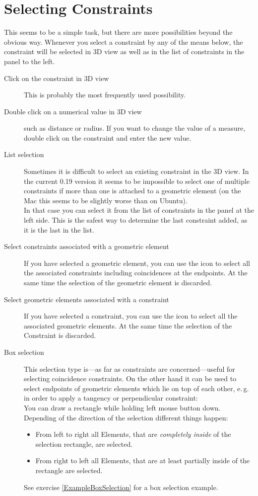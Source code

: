 \documentclass[12pt,titlepage]{article}
\newcommand{\icon}[1]{\raisebox{-1em}{\rule{0pt}{27pt}\texttt{[image: images/\#1]}}}
\begin{document}
\section{Selecting Constraints} This seems to be a simple task, but there are more possibilities beyond the obvious way. Whenever you select a constraint by any of the means below, the constraint will be selected in 3D view as well as in the list of constraints in the panel to the left. \begin{description} \item [Click on the constraint in 3D view] This is probably the most frequently used possibility. \item [Double click on a numerical value in 3D view] such as distance or radius. If you want to change the value of a measure, double click on the constraint and enter the new value. \item [List selection] Sometimes it is difficult to select an existing constraint in the 3D view. In the current 0.19 version it seems to be impossible to select one of multiple constraints if more than one is attached to a geometric element (on the Mac this seems to be slightly worse than on Ubuntu).\\ In that case you can select it from the list of constraints in the panel at the left side. This is the safest way to determine the last constraint added, as it is the last in the list. \item [Select constraints associated with a geometric element] If you have selected a geometric element, you can use the icon \icon{Sketcher_SelectConstraints} to select all the associated constraints including coincidences at the endpoints. At the same time the selection of the geometric element is discarded. \item [Select geometric elements associated with a constraint] If you have selected a constraint, you can use the icon \icon{Sketcher_SelectElementsAssociatedWithConstraints} to select all the associated geometric elements. At the same time the selection of the Constraint is discarded. \item [Box selection] This selection type is---as far as constraints are concerned---useful for selecting coincidence constraints. On the other hand it can be used to select endpoints of geometric elements which lie on top of each other, e.\,g. in order to apply a tangency or perpendicular constraint:\\ You can draw a rectangle while holding left mouse button down. Depending of the direction of the selection different things happen: \begin{itemize} \item From left to right all Elements, that are \emph{completely inside} of the selection rectangle, are selected. \item From right to left all Elements, that are at least partially inside of the rectangle are selected. \end{itemize}
	
	See exercise \vref{ExampleBoxSelection} for a box selection example. \end{description}
\end{document}
